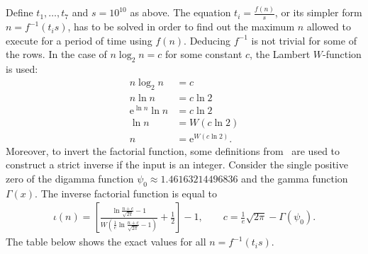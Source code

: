\documentclass[12pt]{article}
\newcommand{\euler}{\mathrm{e}}
\begin{document}
Define $t_{1}, \dots, t_{7}$ and $s = 10^{10}$ as above. The equation $t_{i} = \frac{f(n)}{s}$, or its simpler form $n = f^{-1}(t_{i} s)$, has to be solved in order to find out the maximum $n$ allowed to execute for a period of time using $f(n)$. Deducing $f^{-1}$ is not trivial for some of the rows. In the case of $n \log_{2} n = c$ for some constant $c$, the Lambert $W$-function is used:
\begin{align*}
    n \log_{2} n &= c \\
    n \ln n &= c \ln 2 \\
    \euler^{\ln n} \ln n &= c \ln 2 \\
    \ln n &= W(c \ln 2) \\
    n &= \euler^{W(c \ln 2)}.
\end{align*}
Moreover, to invert the factorial function, some definitions from~\cite{Cantrell:200110:misc} are used to construct a strict inverse if the input is an integer. Consider the single positive zero of the digamma function $\psi_{0} \approx 1.46163214496836$ and the gamma function $\Gamma(x)$. The inverse factorial function is equal to
\begin{align*}
    \iota(n) = \left[\frac{\ln\frac{n + c}{\sqrt{2 \pi}} - 1}{W(\frac{1}{e}\ln\frac{n + c}{\sqrt{2 \pi}} - 1)} + \frac{1}{2}\right] - 1, \qquad c = \frac{1}{e} \sqrt{2 \pi} - \Gamma(\psi_{0}).
\end{align*}
The table below shows the exact values for all $n = f^{-1}(t_{i} s)$.
\end{document}
